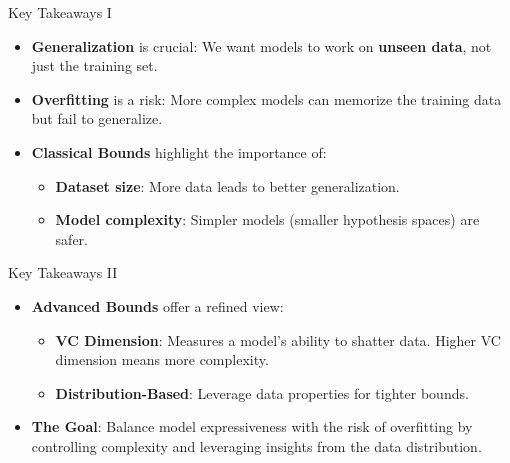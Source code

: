 \documentclass[
  ignorenonframetext,
]{beamer}
\providecommand{\tightlist}{%
  \setlength{\itemsep}{0pt}\setlength{\parskip}{0pt}}\usepackage{longtable,booktabs,array}
\begin{document}
\begin{frame}{Key Takeaways I}
\label{key-takeaways-i}
\begin{itemize}
\tightlist
\item
  \textbf{Generalization} is crucial: We want models to work on
  \textbf{unseen data}, not just the training set.
\item
  \textbf{Overfitting} is a risk: More complex models can memorize the
  training data but fail to generalize.
\item
  \textbf{Classical Bounds} highlight the importance of:

  \begin{itemize}
  \tightlist
  \item
    \textbf{Dataset size}: More data leads to better generalization.
  \item
    \textbf{Model complexity}: Simpler models (smaller hypothesis
    spaces) are safer.
  \end{itemize}
\end{itemize}
\end{frame}

\begin{frame}{Key Takeaways II}
\label{key-takeaways-ii}
\begin{itemize}
\tightlist
\item
  \textbf{Advanced Bounds} offer a refined view:

  \begin{itemize}
  \tightlist
  \item
    \textbf{VC Dimension}: Measures a model's ability to shatter data.
    Higher VC dimension means more complexity.
  \item
    \textbf{Distribution-Based}: Leverage data properties for tighter
    bounds.
  \end{itemize}
\item
  \textbf{The Goal}: Balance model expressiveness with the risk of
  overfitting by controlling complexity and leveraging insights from the
  data distribution.
\end{itemize}
\end{frame}
\end{document}
